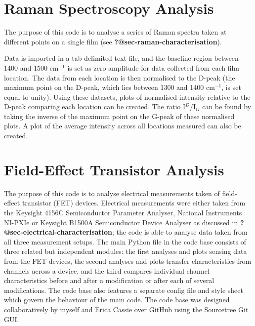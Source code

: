 \documentclass[
  a4paper,
]{scrbook}
\begin{document}
\hypertarget{sec-raman-analysis}{%
\section{Raman Spectroscopy Analysis}\label{sec-raman-analysis}}

The purpose of this code is to analyse a series of Raman spectra taken
at different points on a single film (see
\textbf{?@sec-raman-characterisation}).

Data is imported in a tab-delimited text file, and the baseline region
between 1400 and 1500 cm\(^{-1}\) is set as zero amplitude for data
collected from each film location. The data from each location is then
normalised to the D-peak (the maximum point on the D-peak, which lies
between 1300 and 1400 cm\(^{-1}\), is set equal to unity). Using these
datasets, plots of normalised intensity relative to the D-peak comparing
each location can be created. The ratio I\(^{D}\)/I\(_{G}\) can be found
by taking the inverse of the maximum point on the G-peak of these
normalised plots. A plot of the average intensity across all locations
measured can also be created.

\hypertarget{sec-field-effect-transistor-analysis}{%
\section{Field-Effect Transistor
Analysis}\label{sec-field-effect-transistor-analysis}}

The purpose of this code is to analyse electrical measurements taken of
field-effect transistor (FET) devices. Electrical measurements were
either taken from the Keysight 4156C Semiconductor Parameter Analyser,
National Instruments NI-PXIe or Keysight B1500A Semiconductor Device
Analyser as discussed in \textbf{?@sec-electrical-characterisation}; the
code is able to analyse data taken from all three measurement setups.
The main Python file in the code base consists of three related but
independent modules: the first analyses and plots sensing data from the
FET devices, the second analyses and plots transfer characteristics from
channels across a device, and the third compares individual channel
characteristics before and after a modification or after each of several
modifications. The code base also features a separate config file and
style sheet which govern the behaviour of the main code. The code base
was designed collaboratively by myself and Erica Cassie over GitHub
using the Sourcetree Git GUI.
\end{document}
